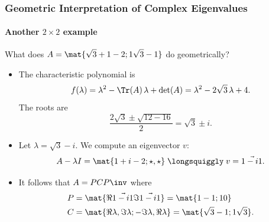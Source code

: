 \begin{frame}
\hfill\null\\

\end{frame}



\begin{frame}
\frametitle{Geometric Interpretation of Complex Eigenvalues}
\framesubtitle{Another $2\times 2$ example}

What does
$\displaystyle A = \mat{\sqrt 3+1 -2; 1 \sqrt 3-1}$ do geometrically?

\medskip
\begin{webonly}
\begin{itemize}
\item The characteristic polynomial is
  \[ f(\lambda) = \lambda^2 - \Tr(A)\,\lambda + \det(A) 
  = \lambda^2 - 2\sqrt 3\,\lambda + 4. \]
  The roots are
  \[ \frac{2\sqrt 3\pm\sqrt{12-16}}2 = \sqrt 3\pm i. \]
\item Let $\lambda = \sqrt 3-i$.  We compute an eigenvector $v$:
  \[ A-\lambda I = \mat{1+i -2; \star, \star} \;\longsquiggly\;
  v = \vec{1-i 1}. \]
\item It follows that $A = PCP\inv$ where
  \[\begin{aligned} 
    P &= \mat{\Re\vec{1-i 1} \Im\vec{1-i 1}} = \mat{1 -1; 1 0} \\
    C &= \mat{\Re\lambda, \Im\lambda; -\Im\lambda, \Re\lambda} 
    = \mat{\sqrt 3 -1; 1 \sqrt 3}. 
  \end{aligned}\]

\end{itemize}
\end{webonly}

\end{frame}



